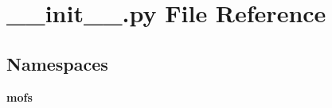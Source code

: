 \section{\-\_\-\-\_\-init\-\_\-\-\_\-.\-py File Reference}
\label{____init_____8py}
\subsection*{Namespaces}
\begin{DoxyCompactItemize}
\item 
{\bf mofs}
\end{DoxyCompactItemize}
